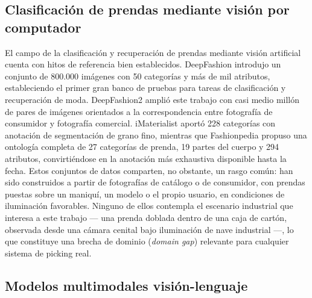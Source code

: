 \documentclass[conference]{IEEEtran}
\begin{document}
\subsection{Clasificación de prendas mediante visión por computador}

El campo de la clasificación y recuperación de prendas mediante visión
artificial cuenta con hitos de referencia bien establecidos. DeepFashion
\cite{liu2016deepfashion} introdujo un conjunto de 800.000 imágenes con 50
categorías y más de mil atributos, estableciendo el primer gran banco de
pruebas para tareas de clasificación y recuperación de moda. DeepFashion2
\cite{ge2019deepfashion2} amplió este trabajo con casi medio millón de pares
de imágenes orientados a la correspondencia entre fotografía de consumidor y
fotografía comercial. iMaterialist \cite{guo2019imaterialist} aportó 228
categorías con anotación de segmentación de grano fino, mientras que
Fashionpedia \cite{jia2020fashionpedia} propuso una ontología completa de 27
categorías de prenda, 19 partes del cuerpo y 294 atributos, convirtiéndose en
la anotación más exhaustiva disponible hasta la fecha. Estos conjuntos de
datos comparten, no obstante, un rasgo común: han sido construidos a partir
de fotografías de catálogo o de consumidor, con prendas puestas sobre un
maniquí, un modelo o el propio usuario, en condiciones de iluminación
favorables. Ninguno de ellos contempla el escenario industrial que interesa a
este trabajo --- una prenda doblada dentro de una caja de cartón, observada
desde una cámara cenital bajo iluminación de nave industrial ---, lo que
constituye una brecha de dominio (\emph{domain gap}) relevante para
cualquier sistema de picking real.

\subsection{Modelos multimodales visión-lenguaje}
\end{document}
